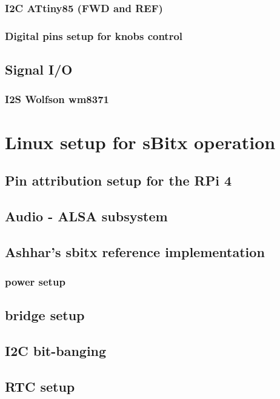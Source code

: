 \documentclass[11pt,a4paper]{article}
\begin{document}
\subsubsection{I2C ATtiny85 (FWD and REF)}

\subsubsection{Digital pins setup for knobs control}

\subsection{Signal I/O}

\subsubsection{I2S Wolfson wm8371}

\section{Linux setup for sBitx operation}

\subsection{Pin attribution setup for the RPi 4}

\subsection{Audio - ALSA subsystem}

\subsection{Ashhar's sbitx reference implementation}

\subsubsection{power setup}

\subsection{bridge setup}

\subsection{I2C bit-banging}

\subsection{RTC setup}
\end{document}
